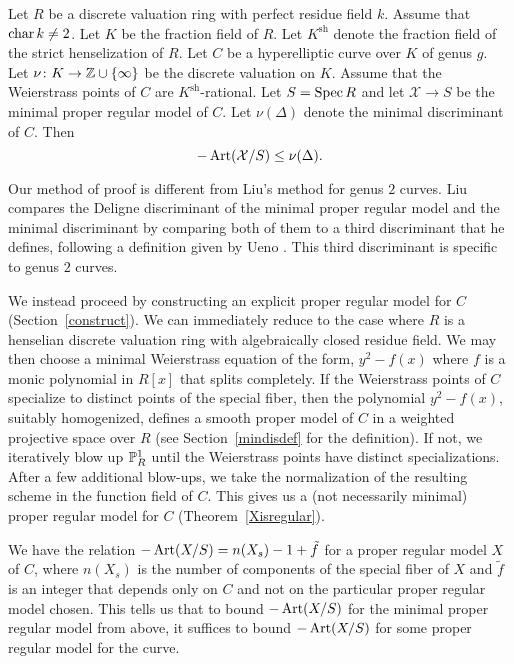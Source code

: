 \begin{thm}\label{main}
 Let $R$ be a discrete valuation ring with perfect residue field $k$. Assume that $\cha k \neq 2$. Let $K$ be the fraction field of $R$. Let $K^{\mathrm{sh}}$ denote the fraction field of the strict henselization of $R$. Let $C$ be a hyperelliptic curve over $K$ of genus $g$. Let $\nu \colon K \rightarrow \Z \cup \{\infty\}$ be the discrete valuation on $K$. Assume that the Weierstrass points of $C$ are $K^{\mathrm{sh}}$-rational. Let $S = \Spec R$ and let $\mathcal{X} \rightarrow S$ be the minimal proper regular model of $C$. Let $\nu(\Delta)$ denote the minimal discriminant of $C$. Then
 \[ -\Art (\mathcal{X}/S) \leq \nu(\Delta) .\]
\end{thm}

Our method of proof is different from Liu's method for genus $2$ curves. Liu compares the Deligne discriminant of the minimal proper regular model and the minimal discriminant by comparing both of them to a third  discriminant that he defines, following a definition given by Ueno \cite[Definition~1, Th\'{e}or\`{e}me~1 and Th\'{e}or\`{e}me~2]{liup}. This third discriminant is specific to genus $2$ curves.

We instead proceed by constructing an explicit proper regular model for $C$ (Section~\ref{construct}). We can immediately reduce to the case where $R$ is a henselian discrete valuation ring with algebraically closed residue field. We may then choose a minimal Weierstrass equation of the form, $y^2-f(x)$ where $f$ is a monic polynomial in $R[x]$ that splits completely. If the Weierstrass points of $C$ specialize to distinct points of the special fiber, then the polynomial $y^2-f(x)$, suitably homogenized, defines a smooth proper model of $C$ in a weighted projective space over $R$ (see Section~\ref{mindisdef} for the definition). If not, we iteratively blow up $\P^1_R$ until the Weierstrass points have distinct specializations. After a few additional blow-ups, we take the normalization of the resulting scheme in the function field of $C$. This gives us a (not necessarily minimal) proper regular model for $C$ (Theorem~\ref{Xisregular}). 

We have the relation $-\Art(X/S) = n(X_s)-1+\tilde{f}$ for a proper regular model $X$ of $C$, where $n(X_s)$ is the number of components of the special fiber of $X$ and $\tilde{f}$ is an integer that depends only on $C$ and not on the particular proper regular model chosen. This tells us that to bound $-\Art (X/S)$ for the minimal proper regular model from above, it suffices to bound $-\Art (X/S)$ for some proper regular model for the curve.

